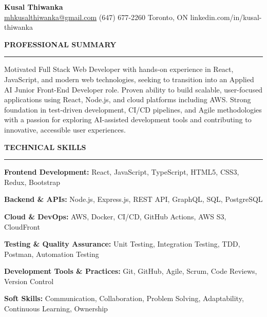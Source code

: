 \documentclass[10pt,letterpaper]{article}
\begin{document}
\begin{center}
{\LARGE\textbf{Kusal Thiwanka}}\\[3pt]
\href{mailto:mhkusalthiwanka@gmail.com}{mhkusalthiwanka@gmail.com}\hspace{2em}%
(647) 677{-}2260\hspace{2em}%
Toronto, ON\hspace{2em}
linkedin.com/in/kusal-thiwanka
\end{center}

\vspace{6pt}

\textbf{PROFESSIONAL SUMMARY}\\[-8pt]
\noindent\rule{\textwidth}{1pt}

\vspace{-2pt}

Motivated Full Stack Web Developer with hands-on experience in React, JavaScript, and modern web technologies, seeking to transition into an Applied AI Junior Front-End Developer role. Proven ability to build scalable, user-focused applications using React, Node.js, and cloud platforms including AWS. Strong foundation in test-driven development, CI/CD pipelines, and Agile methodologies with a passion for exploring AI-assisted development tools and contributing to innovative, accessible user experiences.

\vspace{8pt}

\textbf{TECHNICAL SKILLS}\\[-8pt]
\noindent\rule{\textwidth}{1pt}

\vspace{-2pt}

\textbf{Frontend Development:} React, JavaScript, TypeScript, HTML5, CSS3, Redux, Bootstrap

\textbf{Backend \& APIs:} Node.js, Express.js, REST API, GraphQL, SQL, PostgreSQL

\textbf{Cloud \& DevOps:} AWS, Docker, CI/CD, GitHub Actions, AWS S3, CloudFront

\textbf{Testing \& Quality Assurance:} Unit Testing, Integration Testing, TDD, Postman, Automation Testing

\textbf{Development Tools \& Practices:} Git, GitHub, Agile, Scrum, Code Reviews, Version Control

\textbf{Soft Skills:} Communication, Collaboration, Problem Solving, Adaptability, Continuous Learning, Ownership

\vspace{8pt}
\end{document}
